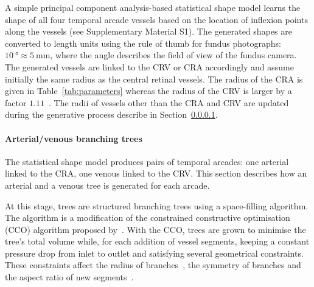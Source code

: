 \documentclass[11pt,]{article}
\begin{document}
A simple principal component analysis-based statistical shape model learns the shape of all four temporal arcade vessels based on the location of inflexion points along the vessels (see Supplementary Material S1).
The generated shapes are converted to length units using the rule of thumb for fundus photographs: $\SI{10}{\degree}\approx\SI{5}{\mm}$, where the angle describes the
field of view of the fundus camera. The generated vessels are linked
to the CRV or CRA accordingly and
assume initially the same radius as the central retinal vessels.
The radius of the CRA is given in Table~\ref{tab:parameters} whereas the radius of the CRV is larger by a factor $1.11$~\cite{Goldenberg2013}.
The radii of vessels other than the CRA and CRV are updated during the generative process describe in Section~\ref{sec:CCO}.

\paragraph{Arterial/venous branching trees}\label{sec:CCO}

The statistical shape model produces pairs of temporal arcades: one arterial linked to the CRA, one venous linked to the CRV.
This section describes how an arterial and a venous tree is generated for each arcade.

At this stage, trees are structured branching trees using a
space-filling algorithm. The algorithm is a modification of the
constrained constructive optimisation (CCO) algorithm proposed
by~\cite{Talou2021}. With the CCO, trees are grown to minimise the tree’s
total volume while, for each addition of vessel segments,
keeping a constant pressure drop from
inlet to outlet and satisfying several geometrical constraints.
These constraints affect the radius of branches~\cite{Murray_1926}, the symmetry of branches and the aspect ratio of new segments~\cite{Talou2021}.
\end{document}
